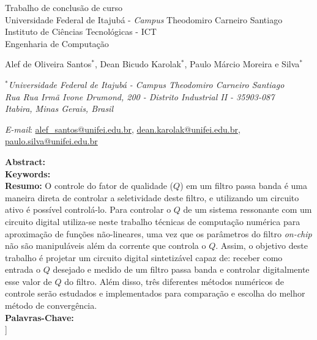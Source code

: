	\begin{center}

		
		\Large 
		 	Trabalho de conclusão de curso \\
		 	Universidade Federal de Itajubá - \textit{Campus} Theodomiro Carneiro Santiago\\
			Instituto de Ciências Tecnológicas - ICT\\
			\large
			Engenharia de Computação
		
		\normalsize
			
			
			\vspace*{1cm}
			\textbf{\thetitle}
			\vspace*{1cm}

			Alef de Oliveira Santos${}^*$, Dean Bicudo Karolak${}^*$, Paulo Márcio Moreira e Silva${}^*$

			\vspace*{0.5cm}

			${}^*$\textit{Universidade Federal de Itajubá - Campus Theodomiro Carneiro Santiago \\ Rua Rua Irmã Ivone Drumond, 200 - Distrito Industrial II - 35903-087 \\
			Itabira, Minas Gerais, Brasil} \\

			\vspace*{0.5cm}

			\textit{E-mail}: 
				\href{mailto:alef_santos@unifei.edu.br}{alef\_santos@unifei.edu.br}, 
				\href{mailto:dean.karolak@unifei.edu.br}{dean.karolak@unifei.edu.br},
				\href{mailto:paulo.silva@unifei.edu.br }{paulo.silva@unifei.edu.br} 
		
		
	\end{center}

	\noindent

	\textbf{Abstract:}\\

	\textbf{Keywords:}\\

	\textbf{Resumo:} 
	O controle do fator de qualidade ($Q$) em um filtro passa banda é uma maneira direta de controlar a seletividade deste filtro, e utilizando um circuito ativo é possível controlá-lo. Para controlar o $Q$ de um sistema ressonante com um circuito digital utiliza-se neste trabalho técnicas de computação numérica para aproximação de funções não-lineares, uma vez que os parâmetros do filtro \textit{on-chip} não são manipuláveis além da corrente que controla o $Q$. Assim, o objetivo deste trabalho é projetar um circuito digital sintetizável capaz de: receber como entrada o $Q$  desejado e medido de um filtro passa banda e controlar digitalmente esse valor de $Q$ do filtro. Além disso, três diferentes métodos numéricos de controle serão estudados e implementados para comparação e escolha do melhor método de convergência. \\
	\textbf{Palavras-Chave:}\\
]


